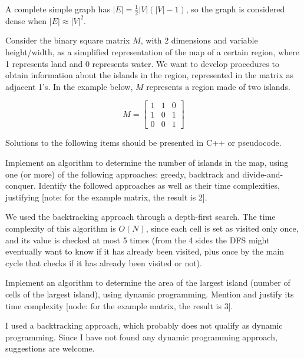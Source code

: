 {\ansseparator

A complete simple graph has $|E|=\frac{1}{2}|V|(|V|-1)$, so the graph is considered dense when $|E| \approx |V|^2$.


Consider the binary square matrix $M$, with 2 dimensions and variable height/width, as a simplified representation of the map of a certain region, where 1 represents land and 0 represents water. We want to develop procedures to obtain information about the islands in the region, represented in the matrix as adjacent 1's. In the example below, $M$ represents a region made of two islands.

\begin{equation*}
    M = \begin{bmatrix}
        1 & 1 & 0 \\
        1 & 0 & 1 \\
        0 & 0 & 1
    \end{bmatrix}
\end{equation*}

Solutions to the following items should be presented in C++ or pseudocode.

Implement an algorithm to determine the number of islands in the map, using one (or more) of the following approaches: greedy, backtrack and divide-and-conquer. Identify the followed approaches as well as their time complexities, justifying [note: for the example matrix, the result is 2].

\ansseparator



We used the backtracking approach through a depth-first search. The time complexity of this algorithm is $O(N)$, since each cell is set as visited only once, and its value is checked at most 5 times (from the 4 sides the DFS might eventually want to know if it has already been visited, plus once by the main cycle that checks if it has already been visited or not).

Implement an algorithm to determine the area of the largest island (number of cells of the largest island), using dynamic programming. Mention and justify its time complexity [node: for the example matrix, the result is 3].

\ansseparator



I used a backtracking approach, which probably does not qualify as dynamic programming. Since I have not found any dynamic programming approach, suggestions are welcome.

}
